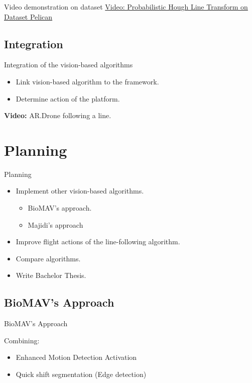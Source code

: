 \documentclass{beamer}
\begin{document}
\begin{frame}{Video demonstration on dataset}
\href{http://youtu.be/GqdAJ3AUrmg}{Video: Probabilistic Hough Line Transform on Dataset Pelican}
\end{frame}

\subsection{Integration}
\begin{frame}{Integration of the vision-based algorithms}
\begin{itemize}
\item Link vision-based algorithm to the framework.
\item Determine action of the platform.
\end{itemize}

\textbf{Video:} AR.Drone following a line.
\end{frame}



\section{Planning}
\begin{frame}{Planning}
\begin{itemize}
\item Implement other vision-based algorithms.
\begin{itemize}
\item BioMAV's approach.
\item Majidi's approach
\end{itemize}
\item Improve flight actions of the line-following algorithm.
\item Compare algorithms.
\item Write Bachelor Thesis.
\end{itemize}
\end{frame}

\subsection{BioMAV's Approach}
\begin{frame}{BioMAV's Approach}

Combining:
\begin{itemize}
\item Enhanced Motion Detection Activation
\item Quick shift segmentation (Edge detection)
\end{itemize}
\end{frame}
\end{document}

